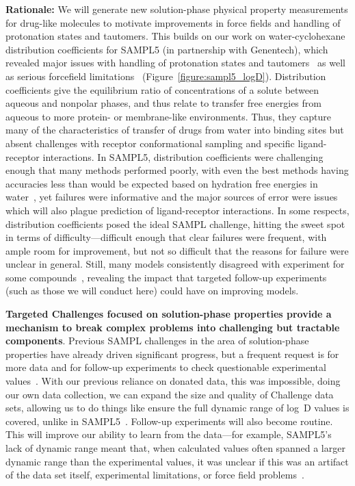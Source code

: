 \documentclass[11pt]{article}
\begin{document}
{\bf Rationale:}
We will generate new solution-phase physical property measurements for drug-like molecules to motivate improvements in force fields and handling of protonation states and tautomers.
This builds on our work on water-cyclohexane distribution coefficients for SAMPL5 (in partnership with Genentech), which revealed major issues with handling of protonation states and tautomers~\cite{Bannan:2016:JComputAidedMolDes}  as well as serious forcefield limitations~\cite{paranahewage_predicting_2016} (Figure~\ref{figure:sampl5_logD}).
Distribution coefficients give the equilibrium ratio of concentrations of a solute between aqueous and nonpolar phases, and thus relate to transfer free energies from aqueous to more protein- or membrane-like environments.
Thus, they capture many of the characteristics of transfer of drugs from water into binding sites but absent challenges with receptor conformational sampling and specific ligand-receptor interactions.
In SAMPL5, distribution coefficients were challenging enough that many methods performed poorly, with even the best methods having accuracies less than would be expected based on hydration free energies in water~\cite{Bannan:2016:JComputAidedMolDes}, yet failures were informative and the major sources of error were issues which will also plague prediction of ligand-receptor interactions.
In some respects, distribution coefficients posed the ideal SAMPL challenge, hitting the sweet spot in terms of difficulty---difficult enough that clear failures were frequent, with ample room for improvement, but not so difficult that the reasons for failure were unclear in general. 
Still, many models consistently disagreed with experiment for some compounds~\cite{paranahewage_predicting_2016, klamt_prediction_2016, Bannan:2016:JComputAidedMolDes, rustenburg_measuring_2016}, revealing the impact that targeted follow-up experiments (such as those we will conduct here) could have on improving models.

\textbf{Targeted Challenges focused on solution-phase properties provide a mechanism to break complex problems into challenging but tractable components}.  
Previous SAMPL challenges in the area of solution-phase properties have already driven significant progress, but a frequent request is for more data and for follow-up experiments to check questionable experimental values~\cite{Mobley:2017:eScholarship}. 
With our previous reliance on donated data, this was impossible, doing our own data collection, we can expand the size and quality of Challenge data sets, allowing us to do things like ensure the full dynamic range of log~D values is covered, unlike in SAMPL5~\cite{rustenburg_measuring_2016, Bannan:2016:JComputAidedMolDes}. 
Follow-up experiments will also become routine. 
This will improve our ability to learn from the data---for example, SAMPL5's lack of dynamic range meant that, when calculated values often spanned a larger dynamic range than the experimental values, it was unclear if this was an artifact of the data set itself, experimental limitations, or force field problems~\cite{rustenburg_measuring_2016, Bannan:2016:JComputAidedMolDes, paranahewage_predicting_2016, klamt_prediction_2016}.  
\end{document}
